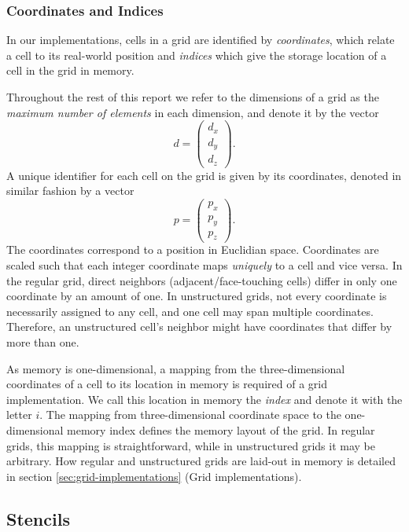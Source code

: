 \subsubsection{Coordinates and Indices}

In our implementations, cells in a grid are identified by \emph{coordinates}, which relate a cell to its real-world position and \emph{indices} which give the storage location of a cell in the grid in memory. 

Throughout the rest of this report we refer to the dimensions of a grid as the \emph{maximum number of elements} in each dimension, and denote it by the vector
$$d = \begin{pmatrix}d_x \\ d_y \\ d_z\end{pmatrix}.$$
A unique identifier for each cell on the grid is given by its coordinates, denoted in similar fashion by a vector
$$p = \begin{pmatrix}p_x \\ p_y \\ p_z\end{pmatrix}.$$
The coordinates correspond to a position in Euclidian space. Coordinates are scaled such that each integer coordinate maps \emph{uniquely} to a cell and vice versa. In the regular grid, direct neighbors (adjacent/face-touching cells) differ in only one coordinate by an amount of one. In unstructured grids, not every coordinate is necessarily assigned to any cell, and one cell may span multiple coordinates. Therefore, an unstructured cell's neighbor might have coordinates that differ by more than one.

As memory is one-dimensional, a mapping from the three-dimensional coordinates of a cell to its location in memory is required of a grid implementation. We call this location in memory the \emph{index} and denote it with the letter $i$. The mapping from three-dimensional coordinate space to the one-dimensional memory index defines the memory layout of the grid. In regular grids, this mapping is straightforward, while in unstructured grids it may be arbitrary. How regular and unstructured grids are laid-out in memory is detailed in section \ref{sec:grid-implementations} (Grid implementations).

\subsection{Stencils}									\label{sec:stencils}

